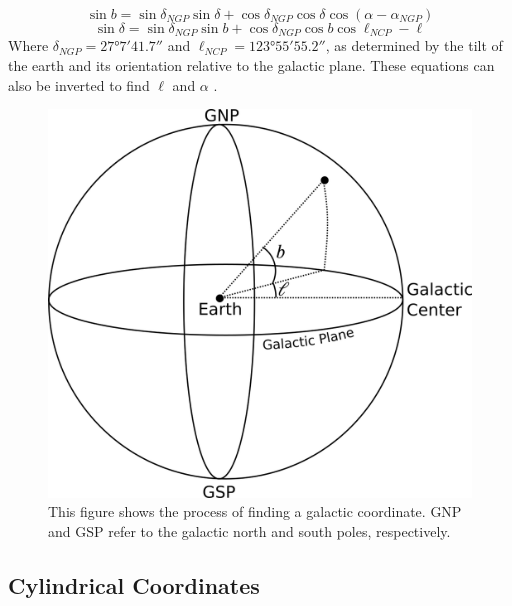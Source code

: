 \documentclass[12pt,twoside]{reedthesis}
\begin{document}
\begin{equation}
    \sin b = \sin \delta_{NGP} \sin \delta + \cos \delta_{NGP} \cos \delta \cos (\alpha-\alpha_{NGP})
\end{equation}
\begin{equation}
    \sin \delta = \sin \delta_{NGP} \sin b + \cos \delta_{NGP} \cos b \cos{\ell_{NCP} - \ell}
\end{equation}
Where $\delta_{NGP} = \ang{27;7;41.7}$ and $\ell_{NCP}=\ang{123;55;55.2}$, as determined by the tilt of the earth and its orientation relative to the galactic plane. These equations can also be inverted to find $\ell$ and $\alpha$ \citep[pp. 900]{modern-astrophysics}.

\begin{figure}[p]
    \includegraphics{imgs/galactic}
    \caption{This figure shows the process of finding a galactic coordinate. GNP and GSP refer to the galactic north and south poles, respectively.}
    \label{galactic-coords}
\end{figure}

\subsection*{Cylindrical Coordinates}
\end{document}
